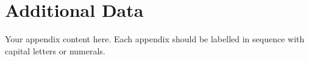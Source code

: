\chapter{Additional Data}
\label{app:data}

Your appendix content here. Each appendix should be labelled
in sequence with capital letters or numerals.
